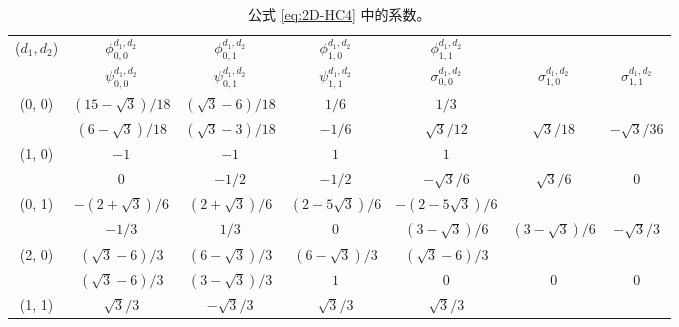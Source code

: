 \begin{table}[htbp]
  \caption{公式 \cref{eq:2D-HC4} 中的系数。}
  \label{ta:coeff-2}
  \centering
  \setlength{\tabcolsep}{4pt}
  \begin{tabular}{ccccccc}
    \toprule
    \multirow{2}{*}{($d_1, d_2$)}
     & $\phi_{0, 0}^{d_1, d_2}$   & $\phi_{0, 1}^{d_1, d_2}$   & $\phi_{1, 0}^{d_1, d_2}$   & $\phi_{1, 1}^{d_1, d_2}$ \\
     & $\psi_{0, 0}^{d_1, d_2}$   & $\psi_{0, 1}^{d_1, d_2}$   & $\psi_{1, 1}^{d_1, d_2}$
     & $\sigma_{0, 0}^{d_1, d_2}$ & $\sigma_{1, 0}^{d_1, d_2}$ & $\sigma_{1, 1}^{d_1, d_2}$                            \\
    \midrule
    \multirow{2}{*}{(0, 0)}
     & $(15-\sqrt3) /18$          & $(\sqrt3-6) /18$           & $1/6$                      & $1/3$                    \\
     & $(6-\sqrt3) /18$           & $(\sqrt3-3) /18$           & $-1/6$
     & $\sqrt3/12$                & $\sqrt3/18$                & $-\sqrt3/36$                                          \\
    \midrule
    \multirow{2}{*}{(1, 0)}
     & $-1$                       & $-1$                       & $1$                        & $1$                      \\
     & $0$                        & $-1/2$                     & $-1/2$
     & $-\sqrt3/6$                & $\sqrt3/6$                 & $0$                                                   \\
    \midrule
    \multirow{2}{*}{(0, 1)}
     & $- (2+\sqrt3) /6$          & $(2+\sqrt3) /6$            & $(2-5\sqrt3) /6$           & $- (2-5\sqrt3) /6$       \\
     & $-1/3$                     & $1/3$                      & $0$
     & $(3-\sqrt3) /6$            & $(3-\sqrt3) /6$            & $-\sqrt3/3$                                           \\
    \midrule
    \multirow{2}{*}{(2, 0)}
     & $(\sqrt3-6) /3$            & $(6-\sqrt3) /3$            & $(6-\sqrt3) /3$            & $(\sqrt3-6) /3$          \\
     & $(\sqrt3-6) /3$            & $(3-\sqrt3) /3$            & $1$
     & $0$                        & $0$                        & $0$                                                   \\
    \midrule
    \multirow{2}{*}{(1, 1)}
     & $\sqrt3/3$                 & $-\sqrt3/3$                & $\sqrt3/3$                 & $\sqrt3/3$               \\

\end{tabular}
\end{table}
